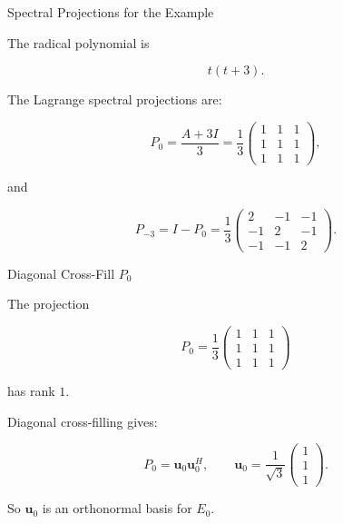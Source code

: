 \documentclass[10pt]{beamer}
\theoremstyle{definition}
\begin{document}
\begin{frame}{Spectral Projections for the Example}

The radical polynomial is

$$
t(t+3).
$$

\vfill

The Lagrange spectral projections are:

$$
P_0=\frac{A+3I}{3}
=\frac13
\begin{pmatrix}
1&1&1\\
1&1&1\\
1&1&1
\end{pmatrix},
$$

\vfill

and

$$
P_{-3}=I-P_0
=\frac13
\begin{pmatrix}
2&-1&-1\\
-1&2&-1\\
-1&-1&2
\end{pmatrix}.
$$

\end{frame}


\begin{frame}{Diagonal Cross-Fill $P_0$}

The projection

$$
P_0=\frac13
\begin{pmatrix}
1&1&1\\
1&1&1\\
1&1&1
\end{pmatrix}
$$

has rank $1$.

\vfill\pause

Diagonal cross-filling gives:

$$
P_0=\mathbf{u}_0\mathbf{u}_0^H,
\qquad
\mathbf{u}_0=\frac{1}{\sqrt3}
\begin{pmatrix}1\\1\\1\end{pmatrix}.
$$

\vfill

So $\mathbf{u}_0$ is an orthonormal basis for $E_0$.

\end{frame}
\end{document}
